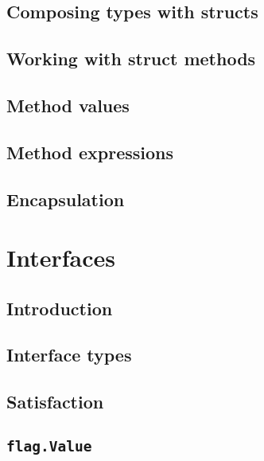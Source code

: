 \documentclass[]{book}
\begin{document}
\hypertarget{composing-types-with-structs}{%
\section{Composing types with structs}\label{composing-types-with-structs}}

\hypertarget{working-with-struct-methods}{%
\section{Working with struct methods}\label{working-with-struct-methods}}

\hypertarget{method-values}{%
\section{Method values}\label{method-values}}

\hypertarget{method-expressions}{%
\section{Method expressions}\label{method-expressions}}

\hypertarget{encapsulation}{%
\section{Encapsulation}\label{encapsulation}}

\hypertarget{interfaces}{%
\chapter{Interfaces}\label{interfaces}}

\hypertarget{introduction}{%
\section{Introduction}\label{introduction}}

\hypertarget{interface-types}{%
\section{Interface types}\label{interface-types}}

\hypertarget{satisfaction}{%
\section{Satisfaction}\label{satisfaction}}

\hypertarget{flag.value}{%
\section{\texorpdfstring{\texttt{flag.Value}}{flag.Value}}\label{flag.value}}
\end{document}
